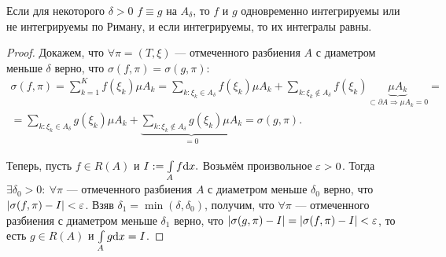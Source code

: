 \begin{Statement}
Если для некоторого $\delta > 0$ $f \equiv g$ на $A_\delta$, то $f$ и $g$ одновременно интегрируемы или не интегрируемы по Риману, и если интегрируемы, то их интегралы равны.
\end{Statement}
\begin{proof}
Докажем, что $\forall \pi = (T, \xi)$ --- отмеченного разбиения $A$ с диаметром меньше $\delta$ верно, что $\sigma(f, \pi) = \sigma(g, \pi)$:
\begin{gather*}
\sigma(f, \pi) = \sum\limits^K_{k=1}f(\xi_k)\mu A_k = \sum\limits_{k: \xi_k \in A_\delta} f(\xi_k)\mu A_k + \sum\limits_{k: \xi_k \not\in A_\delta}f(\xi_k) \underbrace{\mu A_k}_{\subset \partial A \Rightarrow \mu A_k = 0} = \\= \sum\limits_{k: \xi_k \in A_\delta} g(\xi_k)\mu A_k + \underbrace{\sum\limits_{k: \xi_k \not\in A_\delta}g(\xi_k) \mu A_k}_{= 0} = \sigma(g, \pi).
\end{gather*}

Теперь, пусть $f \in R(A)$ и $I := \int\limits_A f \mathrm{d} x.$ Возьмём произвольное $\varepsilon > 0$. Тогда $\exists \delta_0>0:\ \forall \pi$ --- отмеченного разбиения $A$ с диаметром меньше $\delta_0$ верно, что $|\sigma(f, \pi) - I| < \varepsilon$. Взяв $\delta_1 = \min(\delta, \delta_0)$, получим, что $\forall \pi$ --- отмеченного разбиения с диаметром меньше $\delta_1$ верно, что $| \sigma(g, \pi) - I | = |\sigma(f, \pi) - I| < \varepsilon$, то есть $g \in R(A)$ и $\int\limits_A g \mathrm{d} x = I$.

\end{proof}